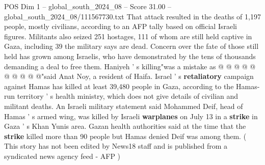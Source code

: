 \begin{textsample}{POS Dim 1 – global\_south\_2024\_08 – Score 31.00 – global\_south\_2024\_08/111567730.txt}
That attack resulted in the deaths of 1,197 people, mostly civilians, according to an AFP tally based on official Israeli figures.
Militants also seized 251 hostages, 111 of whom are still held captive in Gaza, including 39 the military says are dead.
Concern over the fate of those still held has grown among Israelis, who have demonstrated by the tens of thousands demanding a deal to free them.
Haniyeh ' s killing"was a mistake as @ @ @ @ @ @ @ @ @ @"said Anat Noy, a resident of Haifa.
Israel ' s \textbf{retaliatory} campaign against Hamas has killed at least 39,480 people in Gaza, according to the Hamas-run territory ' s health ministry, which does not give details of civilian and militant deaths.
An Israeli military statement said Mohammed Deif, head of Hamas ' s armed wing, was killed by Israeli \textbf{warplanes} on July 13 in a \textbf{strike} in Gaza ' s Khan Yunis area.
Gazan health authorities said at the time that the \textbf{strike} killed more than 90 people but Hamas denied Deif was among them. ( This story has not been edited by News18 staff and is published from a syndicated news agency feed - AFP )

\end{textsample}
